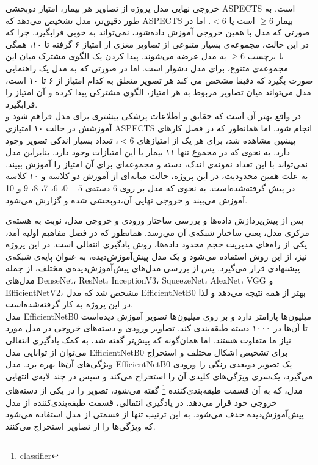 
خروجی نهایی مدل پروژه از تصاویر هر بیمار، امتیاز دوبخشی ASPECTS است.
به طور دقیق‌تر، مدل تشخیص می‌دهد که ASPECTS بیمار $\geq 6$ است یا $<6$.
اما در صورتی که مدل با همین خروجی آموزش داده‌شود،
نمی‌تواند به خوبی فرابگیرد.
چرا که در این حالت،
مجموعه‌ی بسیار متنوعی از تصاویر مغزی از
امتیاز ۶ گرفته تا ۱۰، همگی با برچسب
$\geq6$ به مدل عرضه می‌شوند.
پیدا کردن یک الگوی مشترک میان این مجموعه‌ی متنوع، برای مدل دشوار است.
اما در صورتی که به مدل یک راهنمایی صورت بگیرد که دقیقا مشخص می کند هر تصویر متعلق به کدام امتیاز از ۶ تا ۱۰ است، مدل می‌تواند میان تصاویر مربوط به هر امتیاز، الگوی مشترکی پیدا کرده و آن امتیاز را فرابگیرد.\\

در واقع بهتر آن است که حقایق و اطلاعات پزشکی بیشتری برای مدل فراهم شود و آموزشش در حالت ۱۰ امتیازی ASPECTS انجام شود.
اما همانطور که در فصل کار‌های پیشین مشاهده شد، برای هر یک از امتیاز‌های $<6$، تعداد بسیار اندکی تصویر وجود دارد.
به نحوی که در مجموع تنها ۱۱ بیمار با این امتیازات وجود دارد.
بنابراین مدل نمی‌تواند با این تعداد نمونه‌ی اندک، دسته و مجموعه‌ای برای آن امتیاز را آموزش ببیند.
به علت همین محدودیت، در این پروژه، حالت میانه‌ای از آموزش دو کلاسه و ۱۰ کلاسه در پیش گرفته‌شده‌است.
به نحوی که مدل بر روی 6 دسته‌ی $0-5$، 6، 7، 8، 9 و 10 آموزش می‌بیند و خروجی نهایی آن،‌دوبخشی شده و گزارش می‌شود.


پس از پیش‌پردازش داده‌ها و بررسی ساختار ورودی و خروجی مدل، نوبت به هسته‌ی مرکزی مدل، یعنی ساختار شبکه‌ی آن می‌رسد.
همانطور که در فصل مفاهیم اولیه آمد، یکی از راه‌های مدیریت حجم محدود داده‌ها، روش یادگیری انتقالی است.
در این پروژه نیز، از این روش استفاده می‌شود و یک مدل پیش‌آموزش‌دیده، به عنوان پایه‌ی شبکه‌ی پیشنهادی قرار می‌گیرد.
پس از بررسی مدل‌های پیش‌آموزش‌دیده‌ی مختلف، از جمله مدل‌های DenseNet، ResNet، InceptionV3، SqueezeNet، AlexNet، VGG و EfficientNetV2، مشخص شد که مدل EfficientNetB0 بهتر از همه نتیجه می‌دهد و لذا 
در این پروژه به کار گرفته‌شده‌است.\\

مدل EfficientNetB0 میلیون‌ها پارامتر دارد و بر روی میلیون‌ها تصویر آموزش دیده‌است تا آن‌ها در ۱۰۰۰ دسته طبقه‌بندی کند.
تصاویر ورودی و دسته‌های خروجی در مدل مورد نیاز ما متفاوت هستند. اما
همان‌گونه که پیش‌تر گفته شد، به کمک یادگیری انتقالی می‌توان از توانایی مدل EfficientNetB0 برای تشخیص اشکال مختلف و استخراج ویژگی‌های آن‌ها بهره برد.
مدل EfficientNetB0 یک تصویر دو‌بعدی رنگی را ورودی می‌گیرد، یک‌سری ویژگی‌های کلیدی آن را استخراج می‌کند و 
سپس در چند لایه‌ی انتهایی مدل، که به آن قسمت طبقه‌بندی‌کننده
\footnote{classifier}
گفته می‌شود، تصویر را در یکی از دسته‌های خروجی خود قرار می‌دهد.
در یادگیری انتقالی، قسمت طبقه‌بندی‌کننده از مدل پیش‌آموزش‌دیده حذف می‌شود.
به این ترتیب تنها از قسمتی از مدل استفاده می‌شود که ویژگی‌ها را از تصاویر استخراج می‌کنند.\\

